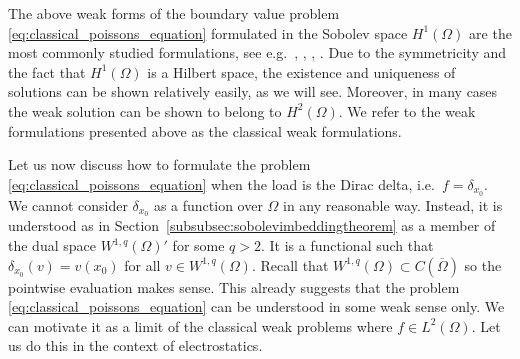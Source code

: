 \documentclass[english, 12pt, a4paper, sci, utf8, a-2b, online]{aaltothesis}
\theoremstyle{definition}
\theoremstyle{plain}
\numberwithin{equation}{section}
\begin{document}
The above weak forms of the boundary value problem
\eqref{eq:classical_poissons_equation} formulated in the
Sobolev space $H^1(\Omega)$ are the most commonly studied formulations,
see e.g.\ \cite{evans2010}, \cite{grisvard2011}, \cite{ciarlet2002},
\cite{braess2007}. Due to the symmetricity and the fact
that $H^1(\Omega)$ is a Hilbert space, the existence and uniqueness of
solutions can be shown relatively easily, as we will see.
Moreover, in many cases the weak solution can be shown to belong to
$H^2(\Omega)$. We refer to the weak formulations presented above as the
classical weak formulations.

Let us now discuss how to formulate the problem 
\eqref{eq:classical_poissons_equation}
when the load is the Dirac delta, i.e.\ $f = \delta_{x_0}$.
We cannot consider $\delta_{x_0}$ as a function over $\Omega$ in any
reasonable way. Instead, it is understood as in
Section~\ref{subsubsec:sobolevimbeddingtheorem} as a member of the dual
space $W^{1,q}(\Omega)'$ for some $q > 2$. It is a functional such that
$\delta_{x_0}(v) = v(x_0)$ for all $v \in W^{1,q}(\Omega)$. Recall that
$W^{1,q}(\Omega) \subset C(\overline{\Omega})$ so the pointwise evaluation
makes sense. This already suggests that
the problem \eqref{eq:classical_poissons_equation} can be understood
in some weak sense only. We can motivate it as a limit of the classical
weak problems where $f \in L^2(\Omega)$.
Let us do this in the context of electrostatics.
\end{document}
